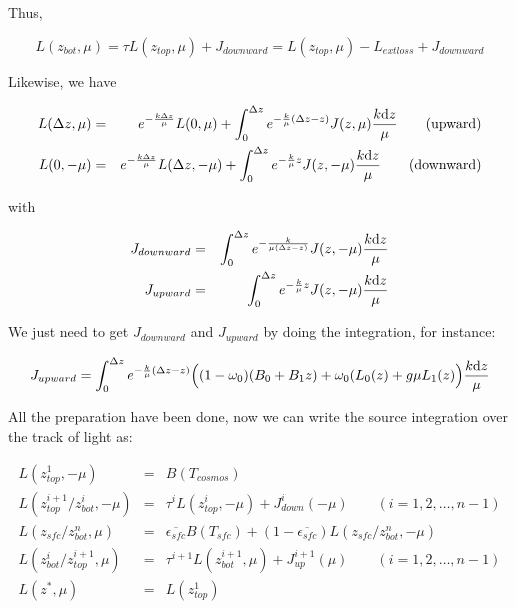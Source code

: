 \documentclass[a4paper]{report}
\begin{document}
Thus,

\begin{equation} \label{eq:simplified}
    L(z_{bot}, \mu) = \tau L(z_{top}, \mu) + J_{downward} 
    = L(z_{top}, \mu) - L_{extloss} + J_{downward}  
\end{equation}

Likewise, we have

\begin{eqnarray} \label{eq:integratesource2}
    L(\Delta z, \mu) & = & e^{-\frac{k\Delta z}{\mu}}L(0, \mu) + \int_{0}^{\Delta z}
    e^{-\frac{k}{\mu}(\Delta z - z)}J(z, \mu)\frac{k\mathrm{d} z}{\mu} \qquad \textrm{(upward)}  \nonumber\\
    L(0, -\mu) & = & e^{-\frac{k\Delta z}{\mu}}L(\Delta z, -\mu) + \int_{0}^{\Delta z}
    e^{-\frac{k}{\mu}z}J(z, -\mu)\frac{k\mathrm{d} z}{\mu} \qquad \textrm{(downward)}
\end{eqnarray}

with

\begin{eqnarray} \label{eq:jspecify}
    J_{downward} & = & \int_{0}^{\Delta z}
    e^{-\frac{k}{\mu(\Delta z - z)}}J(z, -\mu)\frac{k\mathrm{d} z}{\mu} \nonumber \\
    J_{upward} & = & \int_{0}^{\Delta z}
    e^{-\frac{k}{\mu}z}J(z, -\mu)\frac{k\mathrm{d} z}{\mu}
\end{eqnarray}

We just need to get $J_{downward}$ and $J_{upward}$ by doing the integration,
for instance:

\begin{displaymath} 
    J_{upward} = \int_{0}^{\Delta z}
    e^{-\frac{k}{\mu}(\Delta z - z)}
    \Big(
        (1-\omega_{0})(B_{0}+B_{1}z) + \omega_{0}(L_{0}(z) + g\mu L_{1}(z)
    \Big)
    \frac{k\mathrm{d} z}{\mu}
\end{displaymath}


All the preparation have been done, now we can write the source integration over
the track of light as:


\begin{eqnarray} \label{eq:sequential}
    L(z_{top}^{1}, -\mu) & = & B(T_{cosmos}) \nonumber\\
    L(z_{top}^{i+1}/z_{bot}^{i}, -\mu) & = & \tau^{i}L(z_{top}^{i}, -\mu) + J_{down}^{i}(-\mu) 
    \qquad (i=1,2, \ldots, n-1) \nonumber\\
    L(z_{sfc}/z_{bot}^{n}, \mu) & = & \overline{\epsilon_{sfc}}B(T_{sfc}) 
    + (1-\overline{\epsilon_{sfc}})L(z_{sfc}/z_{bot}^{n}, -\mu) \nonumber\\
    L(z_{bot}^{i}/z_{top}^{i+1}, \mu) & = & \tau^{i+1}L(z_{bot}^{i+1}, \mu) + J_{up}^{i+1}(\mu) 
    \qquad (i=1,2, \ldots, n-1) \nonumber\\
    L(z^{*}, \mu) & = & L(z_{top}^{1})
\end{eqnarray}
\end{document}
